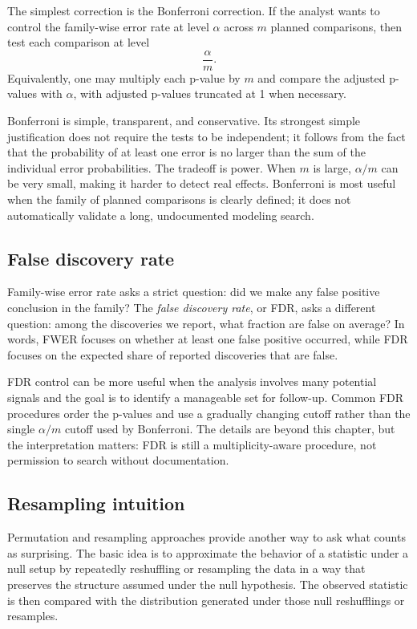 The simplest correction is the Bonferroni correction.  If the analyst wants to control the family-wise error rate at level \(\alpha\) across \(m\) planned comparisons, then test each comparison at level
\begin{equation}
  \frac{\alpha}{m}.
\end{equation}
Equivalently, one may multiply each p-value by \(m\) and compare the adjusted p-values with \(\alpha\), with adjusted p-values truncated at 1 when necessary.

Bonferroni is simple, transparent, and conservative.  Its strongest simple justification does not require the tests to be independent; it follows from the fact that the probability of at least one error is no larger than the sum of the individual error probabilities.  The tradeoff is power.  When \(m\) is large, \(\alpha/m\) can be very small, making it harder to detect real effects.  Bonferroni is most useful when the family of planned comparisons is clearly defined; it does not automatically validate a long, undocumented modeling search.

\subsection*{False discovery rate}

Family-wise error rate asks a strict question: did we make any false positive conclusion in the family?  The \emph{false discovery rate}, or FDR, asks a different question: among the discoveries we report, what fraction are false on average?  In words, FWER focuses on whether at least one false positive occurred, while FDR focuses on the expected share of reported discoveries that are false.

FDR control can be more useful when the analysis involves many potential signals and the goal is to identify a manageable set for follow-up.  Common FDR procedures order the p-values and use a gradually changing cutoff rather than the single \(\alpha/m\) cutoff used by Bonferroni.  The details are beyond this chapter, but the interpretation matters: FDR is still a multiplicity-aware procedure, not permission to search without documentation.

\subsection*{Resampling intuition}

Permutation and resampling approaches provide another way to ask what counts as surprising.  The basic idea is to approximate the behavior of a statistic under a null setup by repeatedly reshuffling or resampling the data in a way that preserves the structure assumed under the null hypothesis.  The observed statistic is then compared with the distribution generated under those null reshufflings or resamples.

